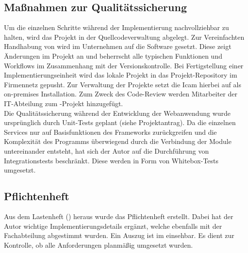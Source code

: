 \subsection{Maßnahmen zur Qualitätssicherung}
\label{sec:Qualitaetssicherung}
Um die einzelnen Schritte während der Implementierung nachvollziehbar zu halten,
wird das Projekt in der Quellcodeverwaltung  abgelegt.
Zur Vereinfachten Handhabung von  wird im Unternehmen auf die Software  gesetzt. 
Diese zeigt Änderungen im Projekt an und beherrscht alle typischen Funktionen und Workflows im Zusammenhang
mit der Versionskontrolle. Bei Fertigstellung einer Implementierungseinheit wird das lokale Projekt in das 
Projekt-Repository im Firmennetz gepusht. Zur Verwaltung der Projekte setzt die \acs{Icam} hierbei auf  
als on-premises Installation. Zum Zweck des Code-Review werden Mitarbeiter der IT-Abteilung zum -Projekt hinzugefügt.\\
Die Qualitätssicherung während der Entwicklung der Webanwendung wurde ursprünglich durch Unit-Tests geplant
(siehe Projektantrag).
Da die einzelnen Services nur auf Basisfunktionen des Frameworks zurückgreifen und die Komplexität des Programms 
überwiegend durch die Verbindung der Module untereinander entsteht, hat sich der Autor auf die Durchführung von
Integrationstests beschränkt. Diese werden in Form von Whitebox-Tests umgesetzt.

\subsection{Pflichtenheft}
\label{sec:Pflichtenheft}
Aus dem Lastenheft () heraus wurde das Pflichtenheft erstellt. 
Dabei hat der Autor wichtige Implementierungsdetails ergänzt, welche ebenfalls mit der Fachabteilung abgestimmt wurden.
Ein Auszug ist im  einsehbar. Es dient zur Kontrolle, ob alle Anforderungen planmäßig
umgesetzt wurden.
\clearpage